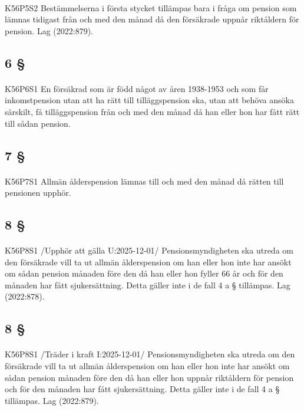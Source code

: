 \documentclass[a4paper,notitlepage,openany,10pt]{book}
\begin{document}
\paragraph*{}
{\tiny K56P5S2}
Bestämmelserna i första stycket tillämpas bara i fråga om pension som lämnas tidigast från och med den månad då den försäkrade uppnår riktåldern för pension.
Lag (2022:879).
\subsection*{6 §}
\paragraph*{}
{\tiny K56P6S1}
En försäkrad som är född något av åren 1938-1953 och som får inkomstpension utan att ha rätt till tilläggspension ska, utan att behöva ansöka särskilt, få tilläggspension från och med den månad då han eller hon har fått rätt till sådan pension.
\subsection*{7 §}
\paragraph*{}
{\tiny K56P7S1}
Allmän ålderspension lämnas till och med den månad då rätten till pensionen upphör.
\subsection*{8 §}
\paragraph*{}
{\tiny K56P8S1}
/Upphör att gälla U:2025-12-01/
Pensionsmyndigheten ska utreda om den försäkrade vill ta ut allmän ålderspension om han eller hon inte har ansökt om sådan pension månaden före den då han eller hon fyller 66 år och för den månaden har fått sjukersättning. Detta gäller inte i de fall 4 a § tillämpas.
Lag (2022:878).
\subsection*{8 §}
\paragraph*{}
{\tiny K56P8S1}
/Träder i kraft I:2025-12-01/
Pensionsmyndigheten ska utreda om den försäkrade vill ta ut allmän ålderspension om han eller hon inte har ansökt om sådan pension månaden före den då han eller hon uppnår riktåldern för pension och för den månaden har fått sjukersättning. Detta gäller inte i de fall 4 a § tillämpas.
Lag (2022:879).
\end{document}
